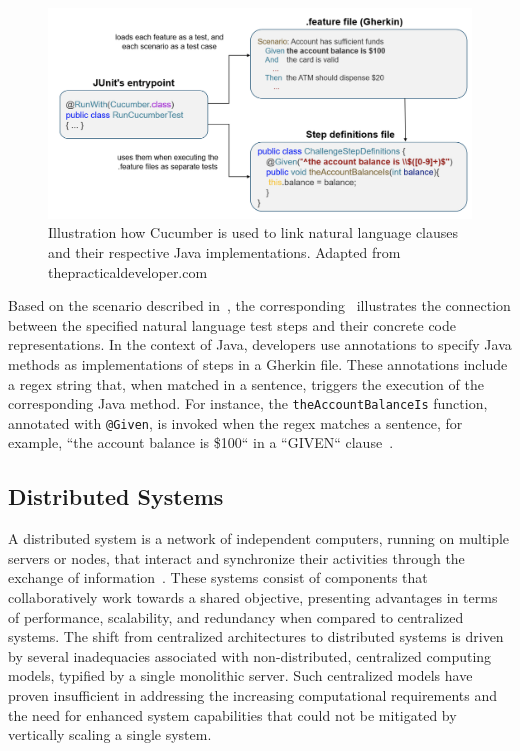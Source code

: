 \begin{figure}
    \centering
    \includegraphics[width=\linewidth]{files/figures/cucumber_test_step_mapping.png}
    \caption{Illustration how Cucumber is used to link natural language clauses and their respective Java implementations. Adapted from thepracticaldeveloper.com~\cite{thepracticaldeveloperIntroductionMicroservice}}
    \label{fig:cucumber-mapping}
\end{figure}

Based on the scenario described in~, the corresponding~ illustrates the connection between the specified natural language test steps and their concrete code representations. In the context of Java, developers use annotations to specify Java methods as implementations of steps in a Gherkin file. These annotations include a regex string that, when matched in a sentence, triggers the execution of the corresponding Java method. For instance, the \texttt{theAccountBalanceIs} function, annotated with \texttt{@Given}, is invoked when the regex matches a sentence, for example, ``the account balance is \$100`` in a ``GIVEN`` clause~\cite{noauthor_bdd_nodate}.

\subsection{Distributed Systems}
\label{subsec:dissys}
A distributed system is a network of independent computers, running on multiple servers or nodes, that interact and synchronize their activities through the exchange of information~\cite{tanenbaum2007distributed}. These systems consist of components that collaboratively work towards a shared objective, presenting advantages in terms of performance, scalability, and redundancy when compared to centralized systems. The shift from centralized architectures to distributed systems is driven by several inadequacies associated with non-distributed, centralized computing models, typified by a single monolithic server. Such centralized models have proven insufficient in addressing the increasing computational requirements and the need for enhanced system capabilities that could not be mitigated by vertically scaling a single system.

